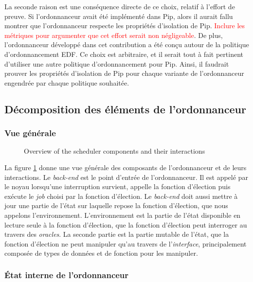 		La seconde raison est une conséquence directe de ce choix, relatif à l'effort de preuve. Si l'ordonnanceur avait été implémenté dans Pip, alors il aurait fallu montrer que l'ordonnanceur respecte les propriétés d'isolation de Pip. \textcolor{red}{Inclure les métriques pour argumenter que cet effort serait non négligeable}. De plus, l'ordonnanceur développé dans cet contribution a été conçu autour de la politique d'ordonnancement EDF. Ce choix est arbitraire, et il serait tout à fait pertinent d'utiliser une autre politique d'ordonnancement pour Pip. Ainsi, il faudrait prouver les propriétés d'isolation de Pip pour chaque variante de l'ordonnanceur engendrée par chaque politique souhaitée.

		\subsection{Décomposition des éléments de l'ordonnanceur}
		\label{sec:project_overview}
			\subsubsection{Vue générale}
			\begin{figure}[!ht]
			    \centering
			    
			    \caption{Overview of the scheduler components and their interactions}
			    \label{fig:project_overview}
			\end{figure}


			La figure \ref{fig:project_overview} donne une vue générale des composants de l'ordonnanceur et de leurs interactions. Le \emph{back-end} est le point d'entrée de l'ordonnanceur. Il est appelé par le noyau lorsqu'une interruption survient, appelle la fonction d'élection puis exécute le \emph{job} choisi par la fonction d'élection. Le \emph{back-end} doit aussi mettre à jour une partie de l'état sur laquelle repose la fonction d'élection, que nous appelons l'environnement. L'environnement est la partie de l'état disponible en lecture seule à la fonction d'élection, que la fonction d'élection peut interroger au travers des \emph{oracles}. La seconde partie est la partie mutable de l'état, que la fonction d'élection ne peut manipuler qu'au travers de l'\emph{interface}, principalement composée de types de données et de fonction pour les manipuler.

		\subsubsection{État interne de l'ordonnanceur}

